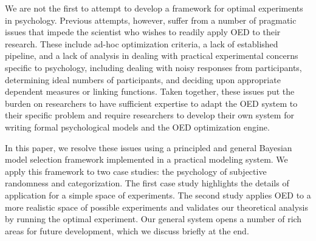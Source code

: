 \documentclass{article}
\newcommand{\ndg}[1]{\textcolor{Green}{[ndg: #1]}}
\begin{document}

We are not the first to attempt to develop a framework for optimal experiments in psychology. 
Previous attempts, however, suffer from a number of pragmatic issues that impede the scientist who wishes to readily apply OED to their research.
These include ad-hoc optimization criteria, a lack of established pipeline, 
and a lack of analysis in dealing with practical experimental concerns specific to psychology, including dealing with noisy responses from participants, determining ideal numbers of participants, and deciding upon appropriate dependent measures or linking functions.
Taken together, these issues put the burden on researchers to have sufficient expertise to adapt the OED system to their specific problem and
require researchers to develop their own system for writing formal psychological models and the OED optimization engine.

In this paper, we resolve these issues using a principled and general Bayesian model selection framework implemented in a practical modeling system.
We apply this framework to two case studies: the psychology of subjective randomness and categorization.
The first case study highlights the details of application for a simple space of experiments.
The second study applies OED to a more realistic space of possible experiments and validates our theoretical analysis by running the optimal experiment.
Our general system opens a number of rich areas for future development, which we discuss briefly at the end.

\end{document}
